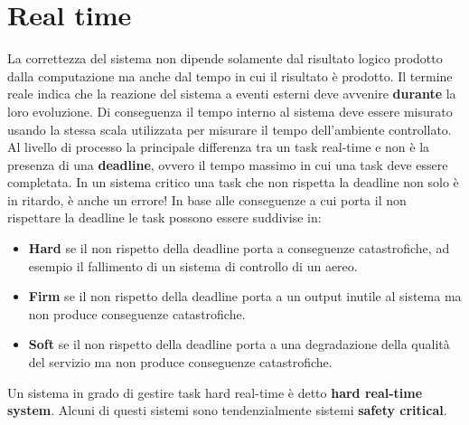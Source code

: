 \documentclass[12pt,openany,onesided]{book}
\begin{document}
\chapter{Real time}
La correttezza del sistema non dipende solamente dal risultato logico prodotto dalla computazione ma anche dal tempo in cui il risultato è prodotto.
Il termine reale indica che la reazione del sistema a eventi esterni deve avvenire \textbf{durante} la loro evoluzione.
Di conseguenza il tempo interno al sistema deve essere misurato usando la stessa scala utilizzata per misurare il tempo dell'ambiente controllato.
Al livello di processo la principale differenza tra un task real-time e non è la presenza di una \textbf{deadline}, ovvero il tempo massimo in cui una task deve essere completata.
In un sistema critico una task che non rispetta la deadline non solo è in ritardo, è anche un errore!
In base alle conseguenze a cui porta il non rispettare la deadline le task possono essere suddivise in:
\begin{itemize}
\item \textbf{Hard} se il non rispetto della deadline porta a conseguenze catastrofiche, ad esempio il fallimento di un sistema di controllo di un aereo.
\item \textbf{Firm} se il non rispetto della deadline porta a un output inutile al sistema ma non produce conseguenze catastrofiche.
\item \textbf{Soft} se il non rispetto della deadline porta a una degradazione della qualità del servizio ma non produce conseguenze catastrofiche.
\end{itemize}
Un sistema in grado di gestire task hard real-time è detto \textbf{hard real-time system}.
Alcuni di questi sistemi sono tendenzialmente sistemi \textbf{safety critical}.
\end{document}

